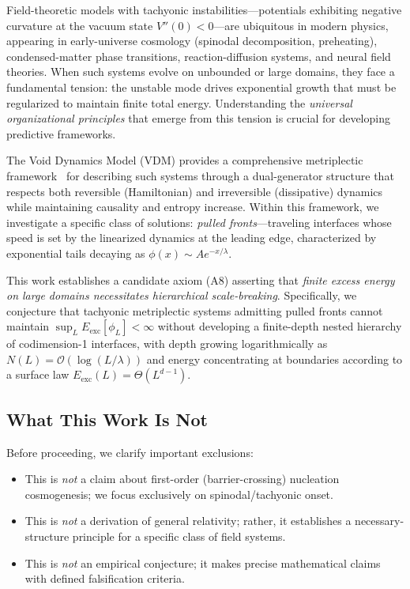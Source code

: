 \documentclass{article}
\begin{document}
Field-theoretic models with tachyonic instabilities---potentials exhibiting negative curvature at the vacuum state $V''(0) < 0$---are ubiquitous in modern physics, appearing in early-universe cosmology (spinodal decomposition, preheating), condensed-matter phase transitions, reaction-diffusion systems, and neural field theories. When such systems evolve on unbounded or large domains, they face a fundamental tension: the unstable mode drives exponential growth that must be regularized to maintain finite total energy. Understanding the \emph{universal organizational principles} that emerge from this tension is crucial for developing predictive frameworks.

The Void Dynamics Model (VDM) provides a comprehensive metriplectic framework~\cite{morrison1984bracket,grmela1997dynamics} for describing such systems through a dual-generator structure that respects both reversible (Hamiltonian) and irreversible (dissipative) dynamics while maintaining causality and entropy increase. Within this framework, we investigate a specific class of solutions: \emph{pulled fronts}---traveling interfaces whose speed is set by the linearized dynamics at the leading edge, characterized by exponential tails decaying as $\phi(x) \sim A e^{-x/\lambda}$.

This work establishes a candidate axiom (A8) asserting that \emph{finite excess energy on large domains necessitates hierarchical scale-breaking}. Specifically, we conjecture that tachyonic metriplectic systems admitting pulled fronts cannot maintain $\sup_L E_{\text{exc}}[\phi_L] < \infty$ without developing a finite-depth nested hierarchy of codimension-1 interfaces, with depth growing logarithmically as $N(L) = \mathcal{O}(\log(L/\lambda))$ and energy concentrating at boundaries according to a surface law $E_{\text{exc}}(L) = \Theta(L^{d-1})$.

\subsection*{What This Work Is Not}

Before proceeding, we clarify important exclusions:
\begin{itemize}[noitemsep]
\item This is \emph{not} a claim about first-order (barrier-crossing) nucleation cosmogenesis; we focus exclusively on spinodal/tachyonic onset.
\item This is \emph{not} a derivation of general relativity; rather, it establishes a necessary-structure principle for a specific class of field systems.
\item This is \emph{not} an empirical conjecture; it makes precise mathematical claims with defined falsification criteria.
\end{itemize}
\end{document}

